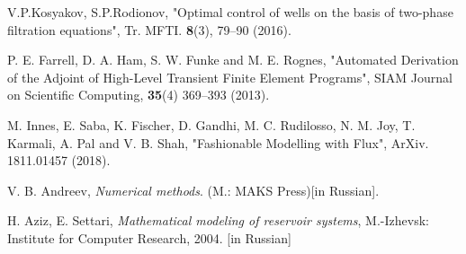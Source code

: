 \documentclass[
11pt,%
tightenlines,%
twoside,%
onecolumn,%
nofloats,%
nobibnotes,%
nofootinbib,%
superscriptaddress,%
noshowpacs,%
centertags]%
{revtex4}
\begin{document}
\begin{thebibliography}{99}
V.P.Kosyakov, S.P.Rodionov, "Optimal control of wells on the basis of two-phase filtration equations",  Tr. MFTI. {\bf 8}(3), 79--90 (2016).

P. E. Farrell, D. A. Ham, S. W. Funke and M. E. Rognes, "Automated Derivation of the Adjoint of High-Level Transient Finite Element Programs", SIAM Journal on Scientific Computing, {\bf 35}(4) 369--393 (2013).

M. Innes, E. Saba, K. Fischer, D. Gandhi, M. C. Rudilosso, N. M. Joy, T. Karmali, A. Pal and V. B. Shah, "Fashionable Modelling with Flux", ArXiv. 1811.01457 (2018).

 V. B. Andreev, \textit{Numerical methods}. (M.: MAKS Press)[in Russian].

 H. Aziz, E. Settari, \textit{Mathematical modeling of reservoir systems},  M.-Izhevsk: Institute for Computer Research, 2004. [in Russian]

\end{thebibliography}
\end{document}
